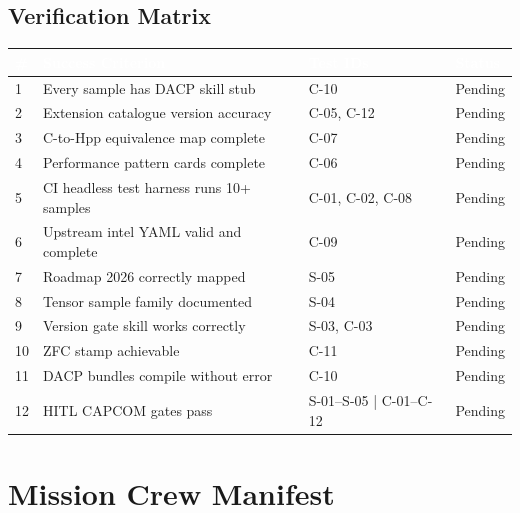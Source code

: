 \documentclass[11pt,letterpaper]{article}
\newcommand{\tableheader}[1]{\textbf{\sffamily\textcolor{white}{#1}}}
\begin{document}
\subsection{Verification Matrix}

\begin{center}
\begin{tabularx}{\textwidth}{C{0.5cm}L{4cm}L{3cm}C{1.5cm}}
\toprule
{}
\tableheader{\#} & \tableheader{Success Criterion} & \tableheader{Test IDs} & \tableheader{Status} \\
 & Every sample has DACP skill stub & C-10 & Pending \\
2 & Extension catalogue version accuracy & C-05, C-12 & Pending \\
3 & C-to-Hpp equivalence map complete & C-07 & Pending \\
4 & Performance pattern cards complete & C-06 & Pending \\
5 & CI headless test harness runs 10+ samples & C-01, C-02, C-08 & Pending \\
6 & Upstream intel YAML valid and complete & C-09 & Pending \\
7 & Roadmap 2026 correctly mapped & S-05 & Pending \\
8 & Tensor sample family documented & S-04 & Pending \\
9 & Version gate skill works correctly & S-03, C-03 & Pending \\
10 & ZFC stamp achievable & C-11 & Pending \\
11 & DACP bundles compile without error & C-10 & Pending \\
12 & HITL CAPCOM gates pass & S-01--S-05 | C-01--C-12 & Pending \\
\bottomrule
\end{tabularx}
\end{center}

\section{Mission Crew Manifest}
\end{document}
